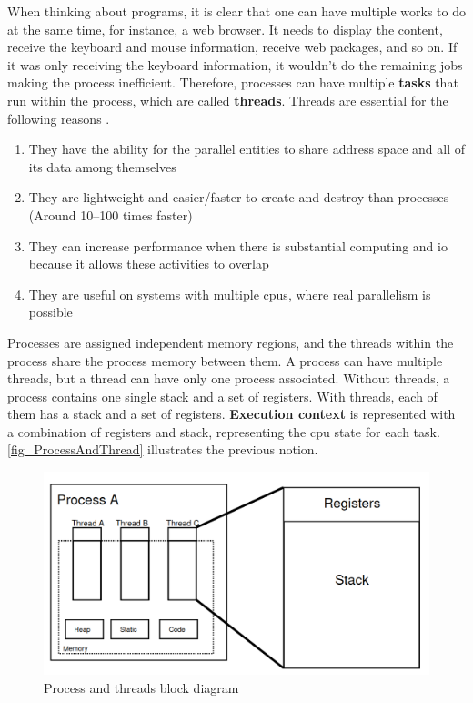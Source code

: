 When thinking about programs, it is clear that one can have multiple works to do at the same time, for instance, a web browser. It needs to 
display the content, receive the keyboard and mouse information, receive web packages, and so on. If it was only receiving the keyboard 
information, it wouldn't do the remaining jobs making the process inefficient. Therefore, processes can have multiple \textbf{tasks} that run 
within the process, which are called \textbf{threads}. Threads are essential for the following reasons \cite{OSbook}.

\begin{enumerate}
    \item They have the ability for the parallel entities to share address space and all of its data among themselves

    \item They are lightweight and easier/faster to create and destroy than processes (Around 10–100 times faster)

    \item They can increase performance when there is substantial computing and \gls{io} because it allows these activities to overlap

    \item They are useful on systems with multiple \glspl{cpu}, where real parallelism is possible
\end{enumerate}

Processes are assigned independent memory regions, and the threads within the process share the process memory between them. A process can 
have multiple threads, but a thread can have only one process associated. Without threads, a process contains one single stack and a set of 
registers. With threads, each of them has a stack and a set of registers. \textbf{Execution context} is represented with a combination of 
registers and stack, representing the \gls{cpu} state for each task. \autoref{fig_ProcessAndThread} illustrates the previous notion. 

\begin{figure}[H]
	\centering
 	\includegraphics[width=0.7\linewidth]{Images/ProcessAndThread.png}
 	\caption{ Process and threads block diagram }
	 \label{fig_ProcessAndThread}
\end{figure}

